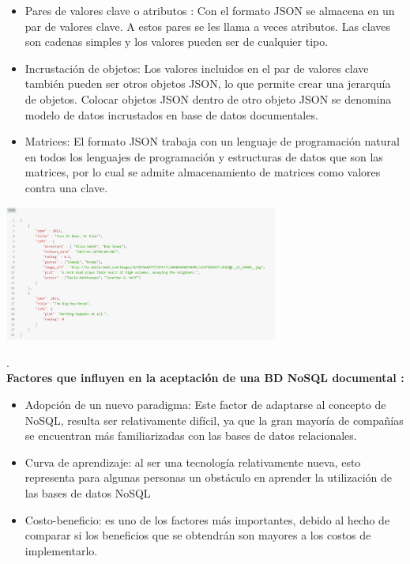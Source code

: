 \documentclass[%
 reprint,
 amsmath,amssymb,
 aps,
]{revtex4-1}
\begin{document}
\begin{itemize}
		\item Pares de valores clave o atributos :  Con el formato JSON se almacena en un par de valores clave. A estos pares se les llama a veces atributos. Las claves son cadenas simples y los valores pueden ser de cualquier tipo.\cite{kyocera}
		\item Incrustación de objetos: Los valores incluidos en el par de valores clave también pueden ser otros objetos JSON, lo que permite crear una jerarquía de objetos. Colocar objetos JSON dentro de otro objeto JSON se denomina modelo de datos incrustados en base de datos documentales.\cite{kyocera}
		\item Matrices: El formato JSON trabaja con un lenguaje de programación natural en todos los lenguajes de programación y estructuras de datos que son las matrices, por lo cual se admite almacenamiento de matrices como valores contra una clave. \cite{kyocera}
\end{itemize}
\begin{center}
	\includegraphics[width=9cm]{./Imagenes/documental2}
\end{center}	
.\\
\textbf{ Factores que influyen en la aceptación de una BD NoSQL documental :}
\begin{itemize}
		\item Adopción de un nuevo paradigma: Este factor de adaptarse al concepto de NoSQL, resulta ser relativamente difícil, ya que la gran mayoría de compañías se encuentran más familiarizadas con las bases de datos relacionales.
		\item Curva de aprendizaje: al ser una tecnología relativamente nueva, esto representa para algunas personas un obstáculo en aprender la utilización de las bases de datos NoSQL
		\item Costo-beneficio: es uno de los factores más importantes, debido al hecho de comparar si los beneficios que se obtendrán son mayores a los costos de implementarlo.                     
\end{itemize}
\end{document}
